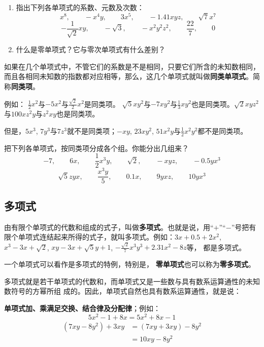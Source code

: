 \begin{ex}
  \begin{enumerate}
      \item 指出下列各单项式的系数、元数及次数：
      \[x^8,\qquad -x^4y,\qquad 3x^5,\qquad -1.41xyz, \qquad \sqrt{7}x^7 \]
      \[-\frac{1}{\sqrt{2}}xy,\qquad -\sqrt{3},\qquad -x^2y^2z^2,\qquad \frac{22}{7},\qquad 0 \]
      \item 什么是零单项式？它与零次单项式有什么差别？
  \end{enumerate} 
\end{ex}

如果在几个单项式中，不管它们的系数是不是相同，只要它们所含的未知数相同，而且各相同未知数的指数都对应相等，那么，这几个单项式就叫做\textbf{同类单项式}。简称\textbf{同类项}。

例如：
$\frac{1}{2}x^2$与$-5x^2$与$\frac{\sqrt{2}}{2}x^2$是同类项。
$\sqrt{5}xy^2$与$-7xy^2$与$\frac{1}{3}xy^2$也是同类项。$\sqrt{2}xyz^2$与$100xz^2y$与$z^2xy$也是同类项。

但是，$5x^3$, $7y^3$与$7z^3$就不是同类项；$-xy$,
$23xy^2$, $51x^2y$与$\frac{1}{2}x^2y^2$都不是同类项。

\begin{ex}
    把下列各单项式，按同类项分成各个组。你能分出几组来？
\[-7,\qquad  6x,\qquad \frac{1}{2}x^3y,\qquad \sqrt{2},\qquad -xyz,\qquad -0.5yx^3 \]
\[\sqrt{5}zyx,\qquad \frac{x^3y}{5},\qquad 0.1x,\qquad 9yxz,\qquad 10yx^3 \]
\end{ex}



\subsection{多项式}
由有限个单项式的代数和组成的式子，叫做\textbf{多项式}。也就是说，用“$+$”“$-$”号把有限个单项式连结起来所得的式子，就叫多项式。例如：$3x+0.5+2x^2$, $x^3-3x+\sqrt{2}$, $xy-3x+\sqrt{5}y+1$, $-\frac{\sqrt{2}}{7}x^3y^3+2.31x^2-8z$等，
都是多项式。

一个单项式可以看作是多项式的特例，特别是，
\textbf{零单项式}也可以称为\textbf{零多项式}。

多项式就是若干单项式的代数和，而单项式又是一些数与具有数系运算通性的未知数符号的方幂所组
成的。因此，单项式自然也具有数系运算通性，就是说：

\textbf{单项式加、乘满足交换、结合律及分配律}；例如：
\begin{equation*}
    5x^2-1+8x=5x^2+8x-1 \tag{交换律}
\end{equation*}
\begin{align*}
(7xy-8y^2)+3xy &=(7xy+3xy)-8y^2 \tag{交换律，结合律}\\
&=10xy-8y^2 \tag{分配律}
\end{align*}

